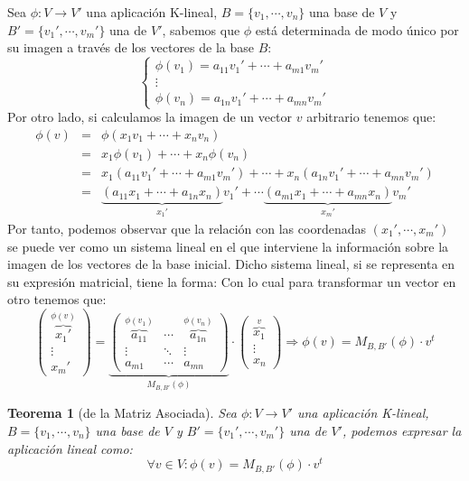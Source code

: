 \documentclass[10pt,a4paper,openright]{book}
\theoremstyle{break}
\newtheorem*{theo}{Teorema}
\begin{document}
Sea $\phi: V\longrightarrow V'$ una aplicación K-lineal, $B=\{v_1,\cdots, v_n\}$ una base de $V$ y $B'=\{v_1',\cdots, v_m'\}$ una de $V'$, sabemos que $\phi$ está determinada de modo único por su imagen a través de los vectores de la base $B$:
$$
\begin{cases}\phi(v_1)=a_{11}v_1'+\cdots+a_{m1}v_m'
\\ \vdots \\ \phi(v_n)=a_{1n}v_1'+\cdots+a_{mn}v_m'\end{cases}
$$
Por otro lado, si calculamos la imagen de un vector $v$ arbitrario tenemos que:
\begin{eqnarray*}
\phi(v)
&=& \phi(x_1v_1+\cdots+x_nv_n) \\
&=& x_1\phi(v_1)+\cdots+x_n\phi(v_n) \\
&=& x_1(a_{11}v_1'+\cdots+a_{m1}v_m')+ \cdots + x_n(a_{1n}v_1'+\cdots + a_{mn}v_m') \\
&=& \underbrace{(a_{11}x_1+\cdots+a_{1n}x_n)}_{x_1'}v_1'+\cdots\underbrace{(a_{m1}x_1+\cdots+a_{mn}x_n)}_{x_m'}v_m'
\end{eqnarray*}
Por tanto, podemos observar que la relación con las coordenadas $(x_1', \cdots, x_m')$ se puede ver como un sistema lineal en el que interviene la información sobre la imagen de los vectores de la base inicial. Dicho sistema lineal, si se representa en su expresión matricial, tiene la forma:
Con lo cual para transformar un vector en otro tenemos que:
$$\left(\begin{array}{c} \overbrace{x_1'}^{\phi(v)} \\ \vdots\\ x_m'\end{array}\right)=\underbrace{\left(\begin{array}{ccc} \overbrace{a_{11}}^{\phi(v_1)} & \cdots & \overbrace{a_{1n}}^{\phi(v_n)} \\ \vdots & \ddots & \vdots \\ a_{m1} & \cdots & a_{mn} \end{array}\right)}_{M_{B,B'}(\phi)}\cdot \left(\begin{array}{c} \overbrace{x_1}^{v} \\ \vdots\\ x_n\end{array}\right) \Rightarrow \phi(v) = M_{B,B'}(\phi)\cdot v^t$$

\begin{theo}[de la Matriz Asociada]
Sea $\phi: V\longrightarrow V'$ una aplicación K-lineal, $B=\{v_1,\cdots, v_n\}$ una base de $V$ y $B'=\{v_1',\cdots, v_m'\}$ una de $V'$, podemos expresar la aplicación lineal como:
$$
\forall v\in V : \phi(v) = M_{B,B'}(\phi) \cdot v^t
$$
\end{theo}
\end{document}
